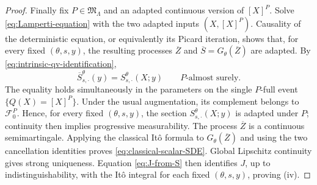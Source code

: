\documentclass[10pt,a4paper]{amsart}
\newcommand{\cF}{\mathcal F}
\begin{document}
\begin{proof}
Finally fix \(P\in\mathfrak M_\Lambda\) and an adapted continuous version of
\([X]^P\).  Solve \eqref{eq:Lamperti-equation} with the two adapted inputs
\((X,[X]^P)\).  Causality of the deterministic equation, or equivalently its
Picard iteration, shows that, for every fixed \((\theta,s,y)\), the resulting
processes \(\overline Z\) and \(\overline S=G_\theta(\overline Z)\) are
adapted.  By
\eqref{eq:intrinsic-qv-identification},
\[
  \overline S_{s,\cdot}^\theta(y)
  =S_{s,\cdot}^\theta(X;y)
  \qquad P\text{-almost surely}.
\]
The equality holds simultaneously in the parameters on the single
\(P\)-full event \(\{Q(X)=[X]^P\}\).  Under the usual augmentation, its
complement belongs to \(\cF_0^P\).  Hence, for every fixed \((\theta,s,y)\),
the section \(S_{s,\cdot}^\theta(X;y)\) is adapted under \(P\); continuity
then implies progressive measurability.  The process
\(\overline Z\) is a continuous semimartingale.  Applying the classical
It\^o formula to \(G_\theta(\overline Z)\) and using the two cancellation
identities proves \eqref{eq:classical-scalar-SDE}.  Global Lipschitz
continuity gives strong uniqueness.  Equation \eqref{eq:J-from-S} then
identifies \(J\), up to indistinguishability, with the It\^o integral for each
fixed \((\theta,s,y)\), proving (iv).
\end{proof}
\end{document}
